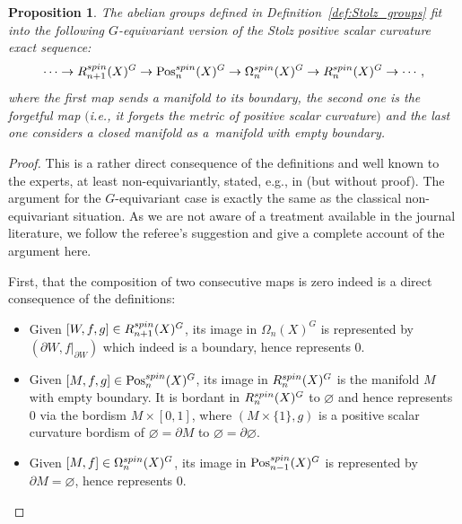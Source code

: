 \documentclass[11pt]{article}
\numberwithin{equation}{section}
\numberwithin{equation}{section}
\newtheorem{Proposition}[Theorem]{Proposition}
{ \theoremstyle{definition}
	\newtheorem{Definition}[Theorem]{Definition}
	\newtheorem{Note}[Theorem]{Note}
	\newtheorem{Example}[Theorem]{Example}
	\newtheorem{Remark}[Theorem]{Remark} }
\newcommand{\boundary}[1]{\partial#1}
\begin{document}
\begin{Proposition}\label{prop:Stolz_seq}
		The abelian groups defined in Definition~{\rm\ref{def:Stolz_groups}} fit into the
		following $G$-equivari\-ant version of the Stolz positive scalar curvature exact sequence:
		\[
			\cdots \to R^{\rm spin}_{n+1}(X)^{G} \to \mathrm{Pos}^{\rm spin}_{n}(X)^{G} \to \Omega^{\rm spin}_{n}(X)^{G} \to R^{\rm spin}_{n}(X)^{G} \to \cdots,
		\]
		where the first map sends a manifold to its boundary, the second one
		is the forgetful map $($i.e., it forgets the metric of positive scalar curvature$)$
		and the last one considers a closed manifold as a~manifold with empty boundary.
	\end{Proposition}
	\begin{proof}
		This is a rather direct consequence of the definitions and well known to the
		experts, at least non-equivariantly, stated, e.g., in \cite[long exact sequence~(4.4)]{Stolz} (but
		without proof). The
		argument for the
		$G$-equivariant case is exactly the same as the classical non-equivariant
		situation. As we are not aware of a treatment available in the journal
		literature, we follow the referee's suggestion and give a complete account
		of the argument here.
		
		First, that the composition of two consecutive maps is zero indeed is a
		direct consequence of the definitions:
		\begin{itemize}\itemsep=0pt
			\item Given $[W,f,g]\in R^{\rm spin}_{n+1}(X)^G$, its image in $\Omega_n(X)^G$ is
			represented by $(\boundary W,f|_{\boundary W})$ which indeed is a boundary, hence represents
			$0$.
			\item Given $[M,f,g]\in \mathrm{Pos}_n^{\rm spin}(X)^G$, its image in $R^{\rm spin}_n(X)^G$ is
			the manifold $M$ with empty boundary. It is bordant in $R^{\rm spin}_n(X)^G$
			to $\varnothing$ and hence represents $0$ via the
			bordism $M\times [0,1]$, where $(M\times \{1\},g)$ is a positive scalar curvature bordism of
			$\varnothing =\boundary M$ to $\varnothing=\boundary\varnothing$.
			\item Given $[M,f]\in \Omega^{\rm spin}_n(X)^G$, its image in
			$\mathrm{Pos}_{n-1}^{\rm spin}(X)^G$ is represented by $\boundary M=\varnothing$, hence
			represents $0$.
		\end{itemize}
		

\end{proof}
\end{document}
